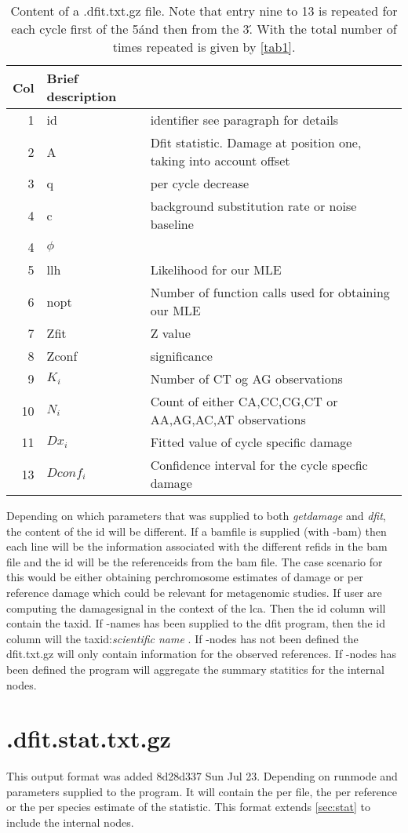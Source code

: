 \documentclass[10pt]{article}
\begin{document}
\begin{table}[h]
\begin{tabular}{rll}
  \hline
  {\bf Col} & {\bf Brief description} \\
  \hline
  1 & {\sf id} & identifier see paragraph for details\\
  2 & {\sf A} & Dfit statistic. Damage at position one, taking into account offset\\
  3 & {\sf q} & per cycle decrease\\
  4 & {\sf c} & background substitution rate or noise baseline\\ 
  4 & {\sf $\phi$} & \\
  5 & {\sf llh} & Likelihood for our MLE\\
  6 & {\sf nopt} & Number of function calls used for obtaining our MLE\\
  7 & {\sf Zfit} & Z value\\
  8 & {\sf Zconf} & significance\\\hline\hline
  9 & {\sf $K_i$} & Number of CT og AG observations\\
  10 & {\sf $N_i$} & Count of either CA,CC,CG,CT or AA,AG,AC,AT observations\\
  11 & {\sf $Dx_i$} & Fitted value of cycle specific damage\\
  13 &{\sf $Dconf_i$ }& Confidence interval for the cycle specfic damage\\\hline\hline     
\end{tabular}\label{tab3}
\caption{Content of a .dfit.txt.gz file. Note that entry nine to 13 is
  repeated for each cycle first of the 5\' and then from the 3\'. With
  the total number of times repeated is given by \ref{tab1}.} 
\end{table}
Depending on which parameters that was supplied to both
\emph{getdamage} and \emph{dfit}, the content of the id will be
different. If a bamfile is supplied (with -bam) then each line will be
the information associated with the different refids in the bam file
and the id will be the referenceids from the bam file. The case
scenario for this would be either obtaining perchromosome estimates of
damage or per reference damage which could be relevant for metagenomic
studies. If user are computing the damagesignal in the context of the
lca. Then the id column will contain the taxid. If -names has been
supplied to the dfit program, then the id column will the
taxid:\emph{scientific name} . If -nodes has not been defined the
dfit.txt.gz will only contain information for the observed
references. If -nodes has been defined the program will aggregate the
summary statitics for the internal nodes.

\section{.dfit.stat.txt.gz}
This output format was added 8d28d337 Sun Jul 23.  Depending on
runmode and parameters supplied to the program. It will contain the
per file, the per reference or the per species estimate of the
statistic. This format extends \ref{sec:stat} to include the internal
nodes.
\end{document}
